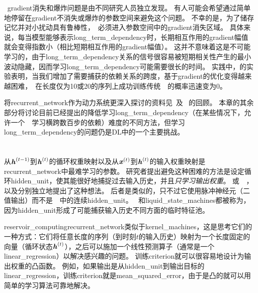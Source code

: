 
~\gls{gradient}消失和爆炸问题是由不同研究人员独立发现\citep{Hochreiter91-small,Bengio_icnn93,Bengio1994ITNN}。
有人可能会希望通过简单地停留在\gls{gradient}不消失或爆炸的参数空间来避免这个问题。
不幸的是，为了储存记忆并对小扰动具有鲁棒性，~必须进入参数空间中的\gls{gradient}消失区域\citep{Bengio_icnn93,Bengio1994ITNN}。
具体来说，每当模型能够表示\gls{long_term_dependency}时，长期相互作用的\gls{gradient}幅值就会变得指数小（相比短期相互作用的\gls{gradient}幅值）。
这并不意味着这是不可能学习的，由于\gls{long_term_dependency}关系的信号很容易被短期相关性产生的最小波动隐藏，因而学习\gls{long_term_dependency}可能需要很长的时间。
实践中，\cite{Bengio1994ITNN}的实验表明，当我们增加了需要捕获的依赖关系的跨度，基于\gls{gradient}的优化变得越来越困难，~在长度仅为10或20的序列上成功训练传统~~的概率迅速变为0。

将\gls{recurrent_network}作为动力系统更深入探讨的资料见~\cite{Doya93,Bengio1994ITNN,Siegelmann+Sontag-1995}及~
\cite{Pascanu-et-al-ICML2013}的回顾。
本章的其余部分将讨论目前已经提出的降低学习\gls{long_term_dependency}（在某些情况下，允许一个~~学习横跨数百步的依赖）难度的不同方法，但学习\gls{long_term_dependency}的问题仍是\gls{DL}中的一个主要挑战。


\section{}
\label{sec:echo_state_networks}
从$\boldsymbol{\mathit{h}}^{(t-1)}$到$\boldsymbol{\mathit{h}}^{(t)}$的循环权重映射以及从$\boldsymbol{\mathit{x}}^{(t)}$到$\boldsymbol{\mathit{h}}^{(t)}$的输入权重映射是\gls{recurrent_network}中最难学习的参数。
研究者\citep{Jaeger-NIPS2002,Maass-et-al-2002,Jaeger+Haas-2004}提出避免这种困难的方法是设定循环\gls{hidden_unit}，使其能很好地捕捉过去输入历史，并且\emph{只学习输出权重}。
或~~\citep{Jaeger+Haas-2004,Jaeger-2007}，以及\citep{Maass-et-al-2002}分别独立地提出了这种想法。
后者是类似的，只不过它使用脉冲神经元（二值输出）而不是~~中的连续\gls{hidden_unit}。
~和\gls{liquid_state_machines}都被称为\citep{Lukosevicius+Jaeger-2009}，因为\gls{hidden_unit}形成了可能捕获输入历史不同方面的临时特征池。


\gls{reservoir_computing}\gls{recurrent_network}类似于\gls{kernel_machines}，这是思考它们的一种方式：它们将任意长度的序列（到时刻$t$的输入历史）映射为一个长度固定的向量（循环状态$\boldsymbol{\mathit{h}}^{(t)}$），之后可以施加一个线性预测算子（通常是一个\gls{linear_regression}）以解决感兴趣的问题。
训练\gls{criterion}就可以很容易地设计为输出权重的凸函数。
例如，如果输出是从\gls{hidden_unit}到输出目标的\gls{linear_regression}，训练\gls{criterion}就是\gls{mean_squared_error}，由于是凸的就可以用简单的学习算法可靠地解决\citep{Jaeger-NIPS2002}。

